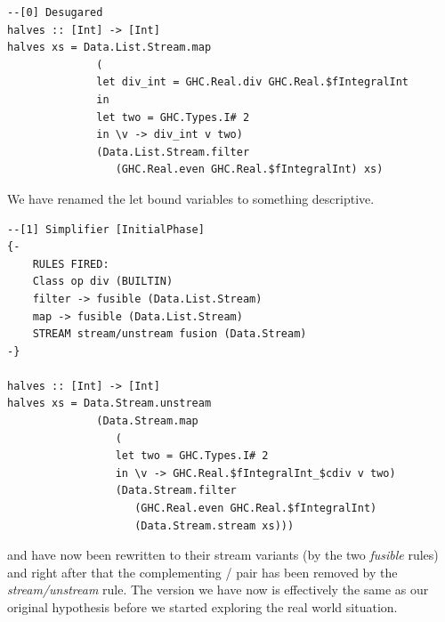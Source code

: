 \begin{listing}[H]
\begin{verbatim}
--[0] Desugared
halves :: [Int] -> [Int]
halves xs = Data.List.Stream.map
              (
              let div_int = GHC.Real.div GHC.Real.$fIntegralInt
              in 
              let two = GHC.Types.I# 2
              in \v -> div_int v two)
              (Data.List.Stream.filter
                 (GHC.Real.even GHC.Real.$fIntegralInt) xs)
\end{verbatim}
\end{listing}

We have renamed the let bound variables to something descriptive.

\begin{listing}[H]
\begin{verbatim}
--[1] Simplifier [InitialPhase]
{-
    RULES FIRED:
    Class op div (BUILTIN)
    filter -> fusible (Data.List.Stream)
    map -> fusible (Data.List.Stream)
    STREAM stream/unstream fusion (Data.Stream)
-}

halves :: [Int] -> [Int]
halves xs = Data.Stream.unstream
              (Data.Stream.map
                 (
                 let two = GHC.Types.I# 2
                 in \v -> GHC.Real.$fIntegralInt_$cdiv v two)
                 (Data.Stream.filter
                    (GHC.Real.even GHC.Real.$fIntegralInt)
                    (Data.Stream.stream xs)))

\end{verbatim}
\end{listing}

 and  have now been rewritten to their stream variants (by the two \textit {fusible} rules) and right after that
the complementing / pair has been removed by the \textit {stream/unstream} rule.
The version we have now is effectively the same as our original hypothesis before we started exploring the real world situation.

